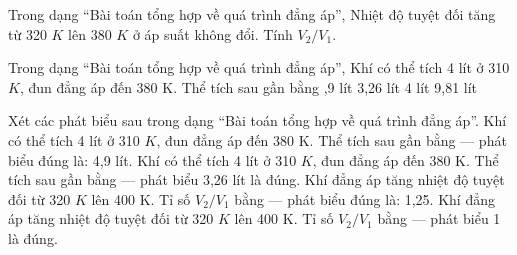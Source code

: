 \begin{ex}
Trong dạng “Bài toán tổng hợp về quá trình đẳng áp”, Nhiệt độ tuyệt đối tăng từ 320 $K$ lên 380 $K$ ở áp suất không đổi. Tính $V_2/V_1$.
\end{ex}

\begin{ex}
Trong dạng “Bài toán tổng hợp về quá trình đẳng áp”, Khí có thể tích 4 lít ở 310 $K$, đun đẳng áp đến 380 K. Thể tích sau gần bằng
\choice
{,9 lít}
{3,26 lít}
{4 lít}
{9,81 lít}
\end{ex}

\begin{ex}
Xét các phát biểu sau trong dạng “Bài toán tổng hợp về quá trình đẳng áp”.
\choiceTF
{\True Khí có thể tích 4 lít ở 310 $K$, đun đẳng áp đến 380 K. Thể tích sau gần bằng — phát biểu đúng là: 4,9 lít.}
{Khí có thể tích 4 lít ở 310 $K$, đun đẳng áp đến 380 K. Thể tích sau gần bằng — phát biểu 3,26 lít là đúng.}
{\True Khí đẳng áp tăng nhiệt độ tuyệt đối từ 320 $K$ lên 400 K. Tỉ số $V_2/V_1$ bằng — phát biểu đúng là: 1,25.}
{Khí đẳng áp tăng nhiệt độ tuyệt đối từ 320 $K$ lên 400 K. Tỉ số $V_2/V_1$ bằng — phát biểu 1 là đúng.}
\end{ex}

